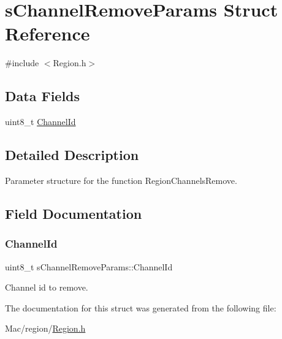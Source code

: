\hypertarget{structsChannelRemoveParams}{}\section{s\+Channel\+Remove\+Params Struct Reference}
\label{structsChannelRemoveParams}


{\ttfamily \#include $<$Region.\+h$>$}

\subsection*{Data Fields}
\begin{DoxyCompactItemize}
\item 
uint8\+\_\+t \hyperlink{structsChannelRemoveParams_a3fd9bc0d34bd1b5483006fa15546c99a}{Channel\+Id}
\end{DoxyCompactItemize}


\subsection{Detailed Description}
Parameter structure for the function Region\+Channels\+Remove. 

\subsection{Field Documentation}
\mbox{\label{structsChannelRemoveParams_a3fd9bc0d34bd1b5483006fa15546c99a}} 
\subsubsection{\texorpdfstring{Channel\+Id}{ChannelId}}
{\footnotesize\ttfamily uint8\+\_\+t s\+Channel\+Remove\+Params\+::\+Channel\+Id}

Channel id to remove. 

The documentation for this struct was generated from the following file\+:\begin{DoxyCompactItemize}
\item 
Mac/region/\hyperlink{Region_8h}{Region.\+h}\end{DoxyCompactItemize}
